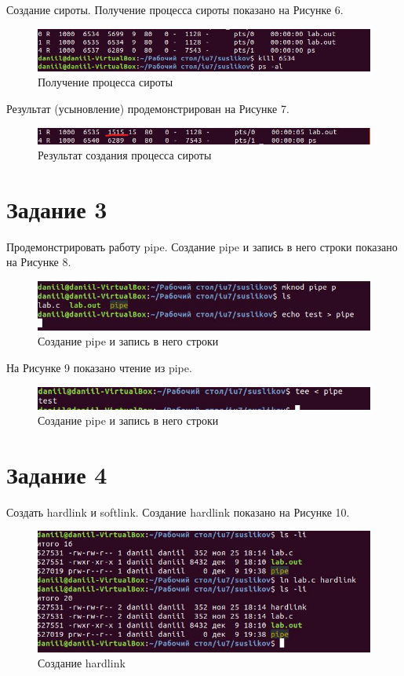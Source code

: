 \documentclass[14pt, a4paper]{extarticle}
\begin{document}
	Создание сироты. \newline
	Получение процесса сироты показано на Рисунке 6.
	\begin{figure}[h!]
		\centering
		\includegraphics[scale=1]{source/5}
		\caption{Получение процесса сироты}
	\end{figure}

	Результат (усыновление) продемонстрирован на Рисунке 7.
	\begin{figure}[h!]
		\centering
		\includegraphics[scale=1]{source/52v2}
		\caption{Результат создания процесса сироты}
	\end{figure}
	 
	 \clearpage
	 \section{Задание 3}
	 Продемонстрировать работу pipe. \newline
	 Создание pipe и запись в него строки показано на Рисунке 8.
	 \begin{figure}[h!]
	 	\centering
	 	\includegraphics[scale=1]{source/6}
	 	\caption{Создание pipe и запись в него строки}
	 \end{figure}
	
	На Рисунке 9 показано чтение из pipe.
	\begin{figure}[h!]
		\centering
		\includegraphics[scale=1]{source/7}
		\caption{Создание pipe и запись в него строки}
	\end{figure}

	\clearpage
	\section{Задание 4}
	Создать hardlink и softlink.\newline
	Создание hardlink показано на Рисунке 10.
	\begin{figure}[h]
		\centering
		\includegraphics[scale=1]{source/8}
		\caption{Создание hardlink}
	\end{figure}
\end{document}
